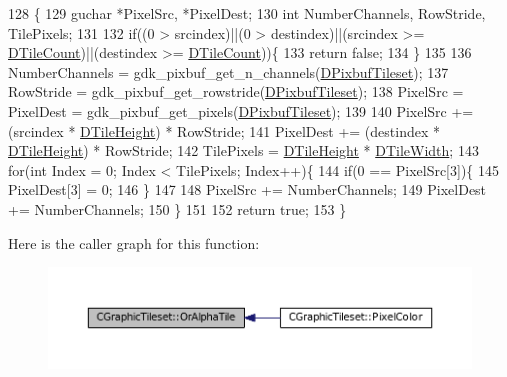 \begin{DoxyCode}
128                                                             \{
129     guchar *PixelSrc, *PixelDest;
130     \textcolor{keywordtype}{int} NumberChannels, RowStride, TilePixels;
131     
132     \textcolor{keywordflow}{if}((0 > srcindex)||(0 > destindex)||(srcindex >= \hyperlink{classCGraphicTileset_a39d942b370e47f441bf97385eb1037c8}{DTileCount})||(destindex >= 
      \hyperlink{classCGraphicTileset_a39d942b370e47f441bf97385eb1037c8}{DTileCount}))\{
133         \textcolor{keywordflow}{return} \textcolor{keyword}{false};
134     \}
135 
136     NumberChannels = gdk\_pixbuf\_get\_n\_channels(\hyperlink{classCGraphicTileset_a5d5adfcdbb347a6df3f57535ca08e3ef}{DPixbufTileset});
137     RowStride = gdk\_pixbuf\_get\_rowstride(\hyperlink{classCGraphicTileset_a5d5adfcdbb347a6df3f57535ca08e3ef}{DPixbufTileset});
138     PixelSrc = PixelDest = gdk\_pixbuf\_get\_pixels(\hyperlink{classCGraphicTileset_a5d5adfcdbb347a6df3f57535ca08e3ef}{DPixbufTileset});
139     
140     PixelSrc += (srcindex * \hyperlink{classCGraphicTileset_af48f32e07d5fe69afd5f764318cc3244}{DTileHeight}) * RowStride;
141     PixelDest += (destindex * \hyperlink{classCGraphicTileset_af48f32e07d5fe69afd5f764318cc3244}{DTileHeight}) * RowStride;
142     TilePixels = \hyperlink{classCGraphicTileset_af48f32e07d5fe69afd5f764318cc3244}{DTileHeight} * \hyperlink{classCGraphicTileset_a2d0c7d19865b81911a3a43d5cae50e00}{DTileWidth};
143     \textcolor{keywordflow}{for}(\textcolor{keywordtype}{int} Index = 0; Index < TilePixels; Index++)\{
144         \textcolor{keywordflow}{if}(0 == PixelSrc[3])\{
145             PixelDest[3] = 0;   
146         \}
147         
148         PixelSrc += NumberChannels;
149         PixelDest += NumberChannels;
150     \}
151     
152     \textcolor{keywordflow}{return} \textcolor{keyword}{true};
153 \}
\end{DoxyCode}
Here is the caller graph for this function\+:
\nopagebreak
\begin{figure}[H]
\begin{center}
\leavevmode
\includegraphics[width=350pt]{classCGraphicTileset_ae456fe77a33c9954b6a22133f5843a15_icgraph}
\end{center}
\end{figure}
\hypertarget{classCGraphicTileset_af278c60b01100c430bedfcedd9e9489f}{}\label{classCGraphicTileset_af278c60b01100c430bedfcedd9e9489f} 
